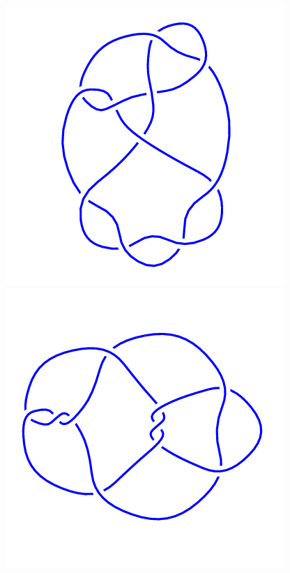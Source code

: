 \begin{figure}[H]
\begin{minipage}[b]{.18\linewidth}
    \end{minipage}
    \begin{minipage}[b]{.18\linewidth}
        \centering
        \includegraphics[width=\linewidth]{../data/10_49.png}
    \end{minipage}
    \begin{minipage}[b]{.18\linewidth}
        \centering
        \includegraphics[width=\linewidth]{../data/10_50.png}

\end{minipage}
\end{figure}

